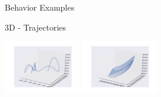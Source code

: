 \documentclass{beamer}
\begin{document}
\begin{frame}[allowframebreaks]{Behavior Examples}
\begin{minipage}{\textwidth}
\begin{block}{3D - Trajectories}
\begin{center}
\includegraphics[width=0.25\textwidth]{figures/behaviors/12.pdf}
\includegraphics[width=0.25\textwidth]{figures/behaviors/13.pdf}
\end{center}
\end{block}
\end{minipage}


\end{frame}
\end{document}

